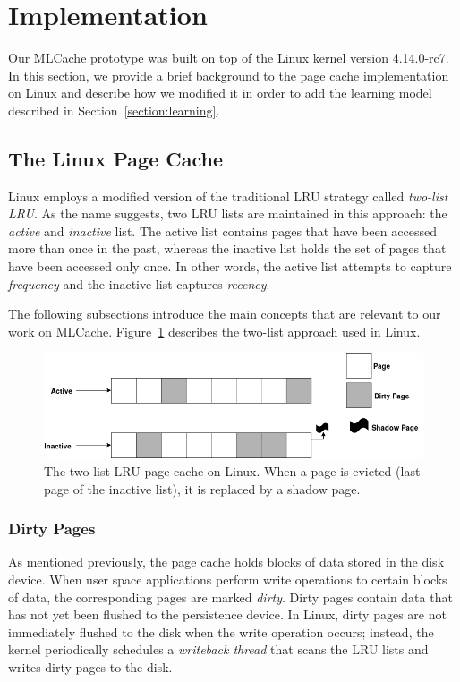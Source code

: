 \section{Implementation}

Our MLCache prototype was built on top of the Linux kernel version 4.14.0-rc7.
In this section, we provide a brief background to the page cache implementation
on Linux and describe how we modified it in order to add the learning model
described in Section~\ref{section:learning}.

\subsection{The Linux Page Cache}

Linux employs a modified version of the traditional LRU strategy called
\emph{two-list LRU}. As the name suggests, two LRU lists are maintained in this
approach: the \emph{active} and \emph{inactive} list. The active list contains
pages that have been accessed more than once in the past, whereas the inactive
list holds the set of pages that have been accessed only once. In other words,
the active list attempts to capture \emph{frequency} and the inactive list
captures \emph{recency}.

The following subsections introduce the main concepts that are relevant to our
work on MLCache. Figure~\ref{fig:lru} describes the two-list approach used in Linux.

\begin{figure}[h]
  \includegraphics[scale=0.3]{img/LinuxLRU.png}
  \caption{The two-list LRU page cache on Linux. When a page is evicted (last
  page of the inactive list), it is replaced by a shadow page.}
  \label{fig:lru}
\end{figure}

\subsubsection{Dirty Pages}

As mentioned previously, the page cache holds blocks of data stored in the disk
device.  When user space applications perform write operations to certain
blocks of data, the corresponding pages are marked \emph{dirty}. Dirty pages
contain data that has not yet been flushed to the persistence device. In Linux,
dirty pages are not immediately flushed to the disk when the write operation
occurs; instead, the kernel periodically schedules a \emph{ writeback thread}
that scans the LRU lists and writes dirty pages to the disk.

